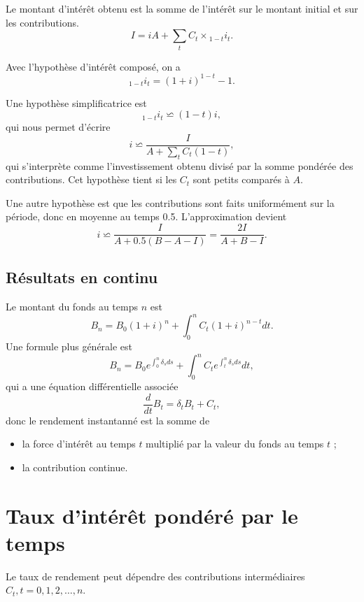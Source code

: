 Le montant d'intérêt obtenu est la somme de l'intérêt sur le montant initial et sur les contributions. 
$$I = iA + \sum_{t}C_t \times {}_{1-t}i_t.$$

Avec l'hypothèse d'intérêt composé, on a 
$${}_{1-t}i_t = (1 + i)^{1-t}-1.$$

Une hypothèse simplificatrice est 
$${}_{1-t}i_t \backsimeq (1-t)i,$$
qui nous permet d'écrire
$$i \backsimeq \frac{I}{A + \sum_t C_t(1-t)},$$
qui s'interprète comme l'investissement obtenu divisé par la somme pondérée des contributions. Cet hypothèse tient si les $C_t$ sont petits comparés à $A$. 

Une autre hypothèse est que les contributions sont faits uniformément sur la période, donc en moyenne au temps 0.5. L'approximation devient
$$i \backsimeq \frac{I}{A + 0.5(B-A-I)} = \frac{2I}{A+B-I}.$$

\subsection{Résultats en continu}

Le montant du fonds au temps $n$ est 
$$B_n = B_0(1 + i)^n + \int_{0}^{n} C_t(1 + i)^{n-t}dt.$$
Une formule plus générale est 
$$B_n = B_0 e^{\int_{0}^{n}\delta_s ds} + \int_{0}^{n}C_t e^{\int_{t}^{n}\delta_s ds} dt,$$
qui a une équation différentielle associée 
$$\frac{d}{dt}B_t = \delta_t B_t + C_t,$$
donc le rendement instantanné est la somme de 
\begin{itemize}
	\item la force d'intérêt au temps $t$ multiplié par la valeur du fonds au temps $t$ ; 
	\item la contribution continue. 
\end{itemize}

\section{Taux d'intérêt pondéré par le temps}

Le taux de rendement peut dépendre des contributions intermédiaires $C_t, t = 0, 1, 2, \dots, n$. 

